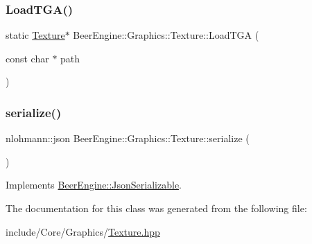 \subsubsection{\texorpdfstring{Load\+T\+G\+A()}{LoadTGA()}}
{\footnotesize\ttfamily static \mbox{\hyperlink{class_beer_engine_1_1_graphics_1_1_texture}{Texture}}$\ast$ Beer\+Engine\+::\+Graphics\+::\+Texture\+::\+Load\+T\+GA (\begin{DoxyParamCaption}\item[{const char $\ast$}]{path }\end{DoxyParamCaption})\hspace{0.3cm}{\ttfamily [static]}}

\mbox{\label{class_beer_engine_1_1_graphics_1_1_texture_acb81c7ded6c7be42b0e901dd57dc8785}} 
\subsubsection{\texorpdfstring{serialize()}{serialize()}}
{\footnotesize\ttfamily nlohmann\+::json Beer\+Engine\+::\+Graphics\+::\+Texture\+::serialize (\begin{DoxyParamCaption}{ }\end{DoxyParamCaption})\hspace{0.3cm}{\ttfamily [virtual]}}



Implements \mbox{\hyperlink{class_beer_engine_1_1_json_serializable_a17689cbd8fe282c570bd026cc1be5b3b}{Beer\+Engine\+::\+Json\+Serializable}}.



The documentation for this class was generated from the following file\+:\begin{DoxyCompactItemize}
\item 
include/\+Core/\+Graphics/\mbox{\hyperlink{_texture_8hpp}{Texture.\+hpp}}\end{DoxyCompactItemize}
